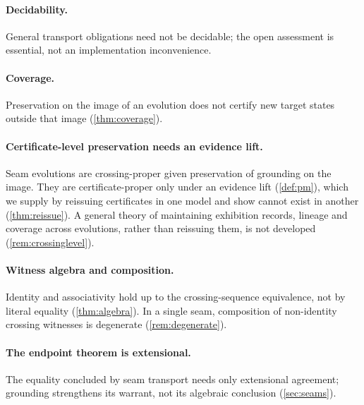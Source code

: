 \paragraph{Decidability.}
General transport obligations need not be decidable; the open assessment is essential, not an implementation inconvenience.

\paragraph{Coverage.}
Preservation on the image of an evolution does not certify new target states outside that image (\cref{thm:coverage}).

\paragraph{Certificate-level preservation needs an evidence lift.}
Seam evolutions are crossing-proper given preservation of grounding on the image. They are certificate-proper only under an evidence lift (\cref{def:pm}), which we supply by reissuing certificates in one model and show cannot exist in another (\cref{thm:reissue}). A general theory of maintaining exhibition records, lineage and coverage across evolutions, rather than reissuing them, is not developed (\cref{rem:crossinglevel}).

\paragraph{Witness algebra and composition.}
Identity and associativity hold up to the crossing-sequence equivalence, not by literal equality (\cref{thm:algebra}). In a single seam, composition of non-identity crossing witnesses is degenerate (\cref{rem:degenerate}).

\paragraph{The endpoint theorem is extensional.}
The equality concluded by seam transport needs only extensional agreement; grounding strengthens its warrant, not its algebraic conclusion (\cref{sec:seams}).

